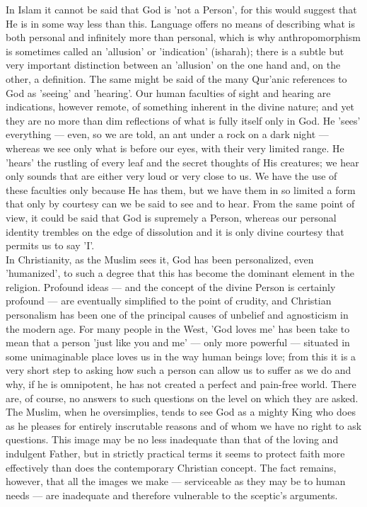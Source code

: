 \documentclass[11pt, b5paper, twoside]{book}
\begin{document}
In Islam it cannot be said that God is 'not a Person', for this would suggest that He is in some way 
less than this. Language offers no means of describing what is both personal and infinitely more than 
personal, which is why anthropomorphism is sometimes called an 'allusion' or 'indication' (isharah); 
there is a subtle but very important distinction between an 'allusion' on the one hand and, on the 
other, a definition. The same might be said of the many Qur'anic references to God as 'seeing' and 
'hearing'. Our human faculties of sight and hearing are indications, however remote, of something 
inherent in the divine nature; and yet they are no more than dim reflections of what is fully itself 
only in God. He 'sees' everything --- even, so we are told, an ant under a rock on a dark night --- 
whereas we see only what is before our eyes, with their very limited range. He 'hears' the rustling 
of every leaf and the secret thoughts of His creatures; we hear only sounds that are either very loud 
or very close to us. We have the use of these faculties only because He has them, but we have them in 
so limited a form that only by courtesy can we be said to see and to hear. From the same point of 
view, it could be said that God is supremely a Person, whereas our personal identity trembles on the 
edge of dissolution and it is only divine courtesy that permits us to say 'I'. \\

In Christianity, as the Muslim sees it, God has been personalized, even 'humanized', to such a degree 
that this has become the dominant element in the religion. Profound ideas --- and the concept of the 
divine Person is certainly profound --- are eventually simplified to the point of crudity, and 
Christian personalism has been one of the principal causes of unbelief and agnosticism in the modern 
age. For many people in the West, 'God loves me' has been take to mean that a person 'just like you 
and me' --- only more powerful --- situated in some unimaginable place loves us in the way human beings 
love; from this it is a very short step to asking how such a person can allow us to suffer as we do 
and why, if he is omnipotent, he has not created a perfect and pain-free world. There are, of course, 
no answers to such questions on the level on which they are asked. \\

The Muslim, when he oversimplies, tends to see God as a mighty King who does as he pleases for 
entirely inscrutable reasons and of whom we have no right to ask questions. This image may be no less 
inadequate than that of the loving and indulgent Father, but in strictly practical terms it seems to 
protect faith more effectively than does the contemporary Christian concept. The fact remains, 
however, that all the images we make --- serviceable as they may be to human needs --- are inadequate and therefore vulnerable to the sceptic's arguments. \\
\end{document}
